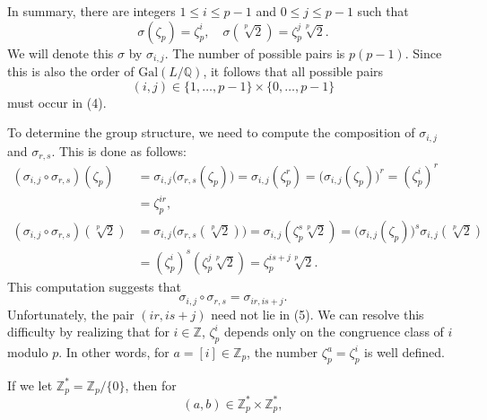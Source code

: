\documentclass[leqno]{article}
\newcommand{\g}[1]{\text{Gal}(#1)}
\theoremstyle{definition}
\theoremstyle{remark}
\theoremstyle{definition}
\begin{document}
    In summary, there are integers $1\leq i\leq p-1$ and $0\leq j\leq p-1$ such that 
        \begin{equation}
            \sigma(\zeta_p)=\zeta_p^i,\quad\sigma(\sqrt[p]{2})=\zeta_p^j\sqrt[p]{2}.
        \end{equation}
    We will denote this $\sigma$ by $\sigma_{i,j}$. The number of possible pairs is $p(p-1)$. Since this is also the order of $\g{L/\mathbb{Q}}$, it follows that all possible pairs
        \begin{equation}
            (i,j)\in\{1,\dots,p-1\}\times\{0,\dots,p-1\}
        \end{equation}
    must occur in (4).\par\hspace{4mm} To determine the group structure, we need to compute the composition of $\sigma_{i,j}$ and $\sigma_{r,s}$. This is done as follows:
        \begin{equation*}
            \begin{split}
                (\sigma_{i,j}\circ\sigma_{r,s})(\zeta_p)&=\sigma_{i,j}\big(\sigma_{r,s}(\zeta_p)\big)=\sigma_{i,j}(\zeta_p^r)=\big(\sigma_{i,j}(\zeta_p)\big)^r=(\zeta_p^i)^r \\
                &=\zeta_p^{ir}, \\
                (\sigma_{i,j}\circ\sigma_{r,s})(\sqrt[p]{2})&=\sigma_{i,j}\big(\sigma_{r,s}(\sqrt[p]{2})\big)=\sigma_{i,j}(\zeta_p^s\sqrt[p]{2})=\big(\sigma_{i,j}(\zeta_p)\big)^s\sigma_{i,j}(\sqrt[p]{2}) \\
                &=(\zeta_p^i)^s(\zeta_p^j\sqrt[p]{2})=\zeta_p^{is+j}\sqrt[p]{2}.
            \end{split}
        \end{equation*}
    This computation suggests that 
        \begin{equation*}
            \sigma_{i,j}\circ\sigma_{r,s}=\sigma_{ir,is+j}.
        \end{equation*}
    Unfortunately, the pair $(ir,is+j)$ need not lie in (5). We can resolve this difficulty by realizing that for $i\in\mathbb{Z}$, $\zeta_p^i$ depends only on the congruence class of $i$ modulo $p$. In other words, for $a=[i]\in\mathbb{Z}_p$, the number $\zeta_p^a=\zeta_p^i$ is well defined.\par\hspace{4mm} If we let $\mathbb{Z}_p^{*}=\mathbb{Z}_p/\{0\}$, then for 
        \begin{equation*}
            (a,b)\in\mathbb{Z}_p^{*}\times\mathbb{Z}_p^{*},
        \end{equation*}
\end{document}
